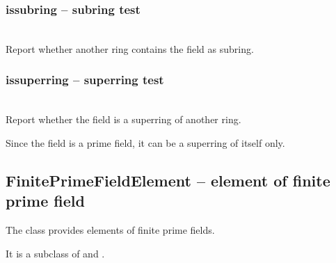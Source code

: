   \subsubsection{issubring -- subring test}
   \\
   \spacing
   \quad Report whether another ring contains the field as subring.

%
  \subsubsection{issuperring -- superring test}
   \\
   \spacing
   \quad Report whether the field is a superring of another ring.

   Since the field is a prime field, it can be a superring of itself only.

\C
 \subsection{FinitePrimeFieldElement -- element of finite prime field}
 The class provides elements of finite prime fields.

 It is a subclass of  and . 

